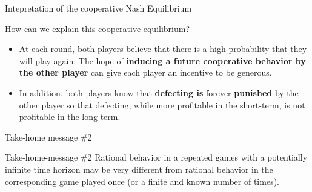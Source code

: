 
\begin{frame}{Intepretation of the cooperative Nash Equilibrium}
    \begin{exampleblock}{How can we explain this cooperative equilibrium?}
        \begin{itemize}
            \item At each round, both players believe that there is a high probability that they
            will play again. The hope of \textbf{inducing a future cooperative behavior by the other
            player} can give each player an incentive to be generous.
            \item In addition, both players know that \textbf{defecting is} forever \textbf{punished} by
            the other player so that defecting, while more profitable in the short-term, is not profitable
            in the long-term.
        \end{itemize}
    \end{exampleblock}
\end{frame}

\begin{frame}{Take-home message \#2}
    \begin{block}{Take-home-message \#2}
        Rational behavior in a repeated games with a potentially infinite time horizon may be
        very different from rational behavior in the corresponding game played once (or a finite
        and known number of times).
    \end{block}
\end{frame}
